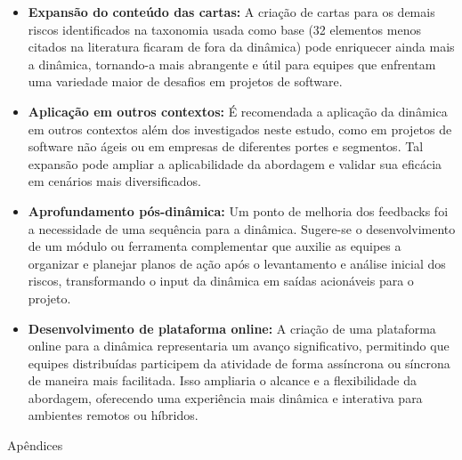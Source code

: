 \documentclass[
	12pt,
	openright,
	twoside,
	a4paper,
	english,
	brazil
	]{abntex2}
\begin{document}
\begin{itemize}
\item \textbf{Expansão do conteúdo das cartas:} A criação de cartas para os demais riscos identificados na taxonomia usada como base \cite{Taxonomy} (32 elementos menos citados na literatura ficaram de fora da dinâmica) pode enriquecer ainda mais a dinâmica, tornando-a mais abrangente e útil para equipes que enfrentam uma variedade maior de desafios em projetos de software.
\item \textbf{Aplicação em outros contextos:} É recomendada a aplicação da dinâmica em outros contextos além dos investigados neste estudo, como em projetos de software não ágeis ou em empresas de diferentes portes e segmentos. Tal expansão pode ampliar a aplicabilidade da abordagem e validar sua eficácia em cenários mais diversificados.
\item \textbf{Aprofundamento pós-dinâmica:} Um ponto de melhoria dos feedbacks foi a necessidade de uma sequência para a dinâmica. Sugere-se o desenvolvimento de um módulo ou ferramenta complementar que auxilie as equipes a organizar e planejar planos de ação após o levantamento e análise inicial dos riscos, transformando o input da dinâmica em saídas acionáveis para o projeto.
\item \textbf{Desenvolvimento de plataforma online:} A criação de uma plataforma online para a dinâmica representaria um avanço significativo, permitindo que equipes distribuídas participem da atividade de forma assíncrona ou síncrona de maneira mais facilitada. Isso ampliaria o alcance e a flexibilidade da abordagem, oferecendo uma experiência mais dinâmica e interativa para ambientes remotos ou híbridos.
\end{itemize}




\postextual



\clearpage
\thispagestyle{empty} %

\vfill
\begin{center}
    {\LARGE Apêndices} %
\end{center}
\vfill
\end{document}
